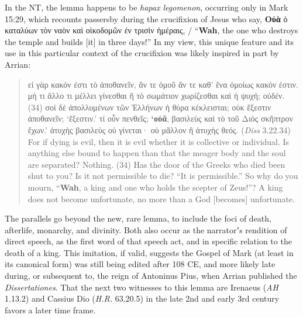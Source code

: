 In the NT, the lemma happens to be \textit{hapax legomenon}, occurring only in Mark 15:29, %
which recounts passersby during the crucifixion of Jesus who say, %
\textbf{Οὐὰ} ὁ καταλύων τὸν ναὸν καὶ οἰκοδομῶν ἐν τρισὶν ἡμέραις, %
/ “\textbf{Wah}, the one who destroys the temple and builds [it] in three days!” %
In my view, this unique feature and its use in this particular context of the crucifixion %
was likely inspired in part by Arrian: %

\vspace*{3mm}
 \begin{quote}εἰ γὰρ κακόν ἐστι τὸ ἀποθανεῖν, ἄν τε ὁμοῦ ἄν τε καθ’ ἕνα ὁμοίως κακόν ἐστιν. %
 μή τι ἄλλο τι μέλλει γίνεσθαι ἢ τὸ σωμάτιον χωρίζεσθαι καὶ ἡ ψυχή; οὐδέν. %
 (34) σοὶ δὲ ἀπολλυμένων τῶν Ἑλλήνων ἡ θύρα κέκλεισται; %
 οὐκ ἔξεστιν ἀποθανεῖν; ‘ἔξεστιν.’ τί οὖν πενθεῖς; %
 \textbf{‘οὐᾶ}, βασιλεὺς καὶ τὸ τοῦ Διὸς σκῆπτρον ἔχων.’ %
 ἀτυχὴς βασιλεὺς οὐ γίνεται· οὐ μᾶλλον ἢ ἀτυχὴς θεός.  (\textit{Diss} 3.22.34) \\[1mm] %
 For if dying is evil, then it is evil whether it is collective or individual. %
 Is anything else bound to happen than that the meager body and the soul are separated? Nothing. %
 (34) Has the door of the Greeks who died been shut to you? %
 Is it not permissible to die? “It is permissible.” So why do you mourn, %
 “\textbf{Wah}, a king and one who holds the scepter of Zeus!”? %
 A king does not become unfortunate, no more than a God [becomes] unfortunate. %
 \end{quote} %
\vspace*{3mm}

\noindent{}The parallels go beyond the new, rare lemma, %
to include the foci of death, afterlife, monarchy, and divinity. %
Both also occur as the narratorʼs rendition of direct speech, %
as the first word of that speech act, %
and in specific relation to the death of a king. %
This imitation, if valid, suggests the Gospel of Mark (at least in its canonical form) %
was still being edited after 108 CE, and more likely late during, or subsequent to, the reign of Antoninus Pius, %
when Arrian published the \textit{Dissertationes}. %
That the next two witnesses to this lemma are Irenaeus (\textit{AH} 1.13.2) and Cassius Dio (\textit{H.R.} 63.20.5) %
in the late 2nd and early 3rd century favors a later time frame. %

